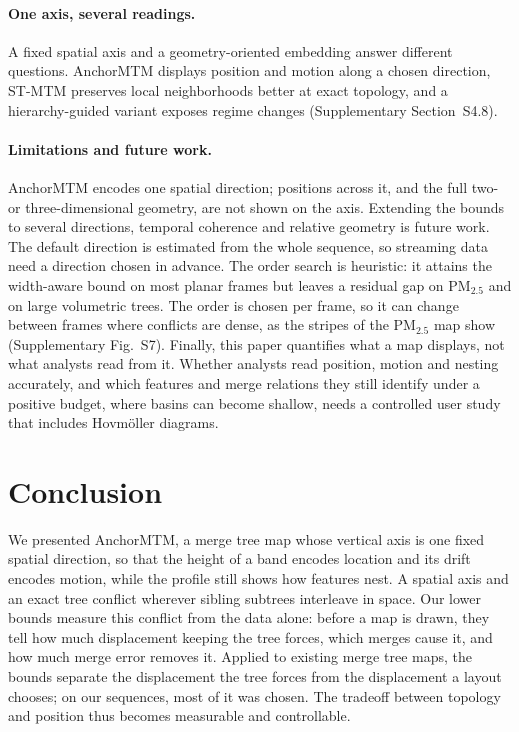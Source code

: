 \paragraph{One axis, several readings.} A fixed spatial axis and a geometry-oriented embedding answer different questions. AnchorMTM displays position and motion along a chosen direction, ST-MTM preserves local neighborhoods better at exact topology, and a hierarchy-guided variant exposes regime changes (Supplementary Section~S4.8).

\paragraph{Limitations and future work.} AnchorMTM encodes one spatial direction; positions across it, and the full two- or three-dimensional geometry, are not shown on the axis. Extending the bounds to several directions, temporal coherence and relative geometry is future work. The default direction is estimated from the whole sequence, so streaming data need a direction chosen in advance. The order search is heuristic: it attains the width-aware bound on most planar frames but leaves a residual gap on PM$_{2.5}$ and on large volumetric trees. The order is chosen per frame, so it can change between frames where conflicts are dense, as the stripes of the PM$_{2.5}$ map show (Supplementary Fig.~S7). Finally, this paper quantifies what a map displays, not what analysts read from it. Whether analysts read position, motion and nesting accurately, and which features and merge relations they still identify under a positive budget, where basins can become shallow, needs a controlled user study that includes Hovm\"oller diagrams.

\section{Conclusion}\label{sec:conclusion}
We presented AnchorMTM, a merge tree map whose vertical axis is one fixed spatial direction, so that the height of a band encodes location and its drift encodes motion, while the profile still shows how features nest. A spatial axis and an exact tree conflict wherever sibling subtrees interleave in space. Our lower bounds measure this conflict from the data alone: before a map is drawn, they tell how much displacement keeping the tree forces, which merges cause it, and how much merge error removes it. Applied to existing merge tree maps, the bounds separate the displacement the tree forces from the displacement a layout chooses; on our sequences, most of it was chosen. The tradeoff between topology and position thus becomes measurable and controllable.
